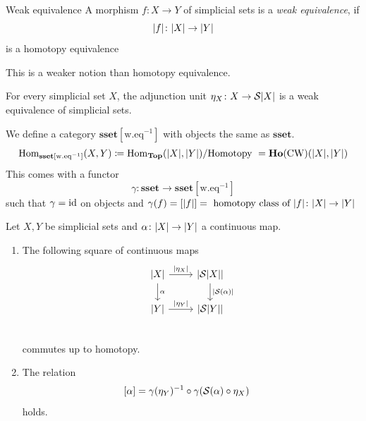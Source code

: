 \documentclass[language=english]{TemplateLecture}
\begin{document}
\begin{defi}{Weak equivalence}{}
    A morphism \(f\colon X \to Y\)  of simplicial sets is a \emph{weak equivalence}, if
    \[\lvert f\rvert\colon \lvert X\rvert\to \lvert Y\rvert\]
    is a homotopy equivalence
\end{defi}

This is a weaker notion than homotopy equivalence.

\begin{proposition}
    For every simplicial set \(X\), the adjunction unit \(\eta_X\colon X \to \mathcal{S}\lvert X\rvert\) is a weak equivalence of simplicial sets.
\end{proposition}

\begin{construction}
    We define a category \(\mathbf{sset}[\mathrm{w.eq}^{-1}]\) with objects the same as \(\mathbf{sset}\).
    \[\operatorname{Hom}_{\mathbf{sset}[\mathrm{w.eq}^{-1}]}(X,Y) \coloneq \operatorname{Hom}_{\mathbf{Top}}(\lvert X\rvert, \lvert Y\rvert)/\text{Homotopy } = \mathbf{Ho}(\mathrm{CW})(\lvert X\rvert, \lvert Y\rvert)\]
    This comes with a functor
    \[\gamma\colon \mathbf{sset} \to \mathbf{sset}[\mathrm{w.eq}^{-1}]\]
    such that \(\gamma = \operatorname{id}\) on objects and \(\gamma(f) = [\lvert f\rvert] = \text{ homotopy class of } \lvert f\rvert\colon \lvert X\rvert \to \lvert Y\rvert\)
\end{construction}

\begin{proposition}
    Let \(X,Y\) be simplicial sets and \(\alpha\colon \lvert X\rvert \to \lvert Y\rvert\) a continuous map.
    \begin{enumerate}
        \item The following square of continuous maps
        \[\begin{tikzcd}
            \abs X \ar[r, "\abs{\eta_X}"]\ar[d, "\alpha"] & \abs{\cS\abs X} \ar[d, "\abs{\cS(\alpha)}"] \\
            \abs Y \ar[r, "\abs{\eta_Y}"] & \abs{\cS\abs Y} \\
        \end{tikzcd}\]
        commutes up to homotopy.
        \item The relation
        \[\begin{split}
            [\alpha] &= \gamma(\eta_Y)^{-1} \circ \gamma(\mathcal{S}(\alpha)\circ \eta_X)
        \end{split}\]
        holds.
    \end{enumerate}
\end{proposition}
\end{document}
